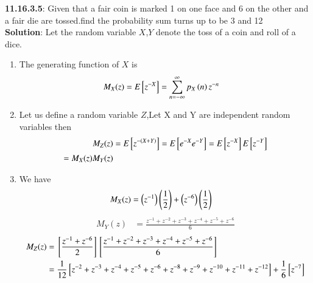 \documentclass[journal,12pt,onecolumn]{IEEEtran}
\begin{document}
 \bigskip 
 \renewcommand{\thefigure}{\theenumi} 
 \renewcommand{\thetable}{\theenumi} 
 \textbf{11.16.3.5}: 
 Given that a fair coin is marked 1 on one face and 6 on the other and a fair die are tossed.find the probability sum turns up to be 3 and 12 \\ 
 \textbf{Solution}: 
         Let the random variable  $X$,$Y$ denote the toss of a coin and roll of a dice.
 \begin{enumerate}[label=(\alph*)] 
	 \item   The  generating function of $X$ is  
                         \begin{align} 
				 M_X(z) &= E{}\left[z^{-X}\right] 
				 = \sum_{n=-\infty}^{\infty}p_X\left(n\right)z^{-n}  
                         \end{align} 
		 \item Let us define a random variable $Z$,Let X and Y are independent random variables then 
			 \begin{align}
				 M_Z(z) &= E{}\left[z^{-(X + Y)}\right] 
					 = E{}\left[e^{-X}e^{-Y}\right] = E{}\left[z^{-X}\right]E{}\left[z^{-Y}\right] \\
					 = M_X(z)M_Y(z) 
			 \end{align}
			 \item  We have 
                        \begin{align}
                                M_X(z) &= \left(z^{-1}\right)\left(\frac{1}{2}\right) + \left(z^{-6}\right)\left(\frac{1}{2}\right) 
                        \end{align}
                         \begin{align}
                                 M_Y(z) &= \frac{z^{-1} + z^{-2} + z^{-3} + z^{-4} + z^{-5} + z^{-6}}{6} 
                         \end{align}
                        \begin{align}
                        M_Z(z) &= {}\left[\frac{z^{-1} + z^{-6}}{2}\right]{}\left[\frac{z^{-1} + z^{-2} + z^{-3} + z^{-4} + z^{-5} + z^{-6}}{6}\right] \\
                                &= \frac{1}{12}{}\left[z^{-2} + z^{-3} + z^{-4} + z^{-5} + z^{-6} + z^{-8} + z^{-9} + z^{-10} + z^{-11} + z^{-12}\right] + \frac{1}{6}{}\left[z^{-7}\right]
                        \end{align}


\end{enumerate}
\end{document}
